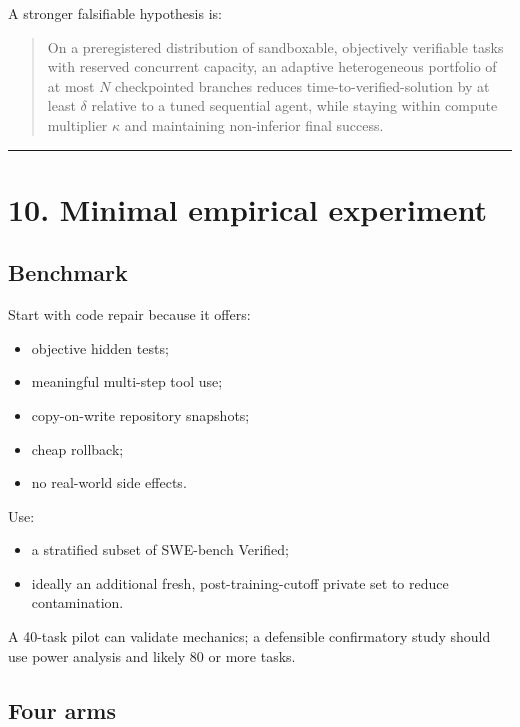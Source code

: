 \documentclass[
  letterpaper,
]{article}
\providecommand{\tightlist}{%
  \setlength{\itemsep}{0pt}\setlength{\parskip}{0pt}}
\begin{document}
A stronger falsifiable hypothesis is:

\begin{quote}
On a preregistered distribution of sandboxable, objectively verifiable tasks with reserved concurrent capacity, an adaptive heterogeneous portfolio of at most \(N\) checkpointed branches reduces time-to-verified-solution by at least \(\delta\) relative to a tuned sequential agent, while staying within compute multiplier \(\kappa\) and maintaining non-inferior final success.
\end{quote}

\begin{center}\rule{0.5\linewidth}{0.5pt}\end{center}

\section{10. Minimal empirical experiment}\label{minimal-empirical-experiment}

\subsection{Benchmark}\label{benchmark}

Start with code repair because it offers:

\begin{itemize}
\tightlist
\item
  objective hidden tests;
\item
  meaningful multi-step tool use;
\item
  copy-on-write repository snapshots;
\item
  cheap rollback;
\item
  no real-world side effects.
\end{itemize}

Use:

\begin{itemize}
\tightlist
\item
  a stratified subset of SWE-bench Verified;
\item
  ideally an additional fresh, post-training-cutoff private set to reduce contamination.
\end{itemize}

A 40-task pilot can validate mechanics; a defensible confirmatory study should use power analysis and likely 80 or more tasks.

\subsection{Four arms}\label{four-arms}
\end{document}
